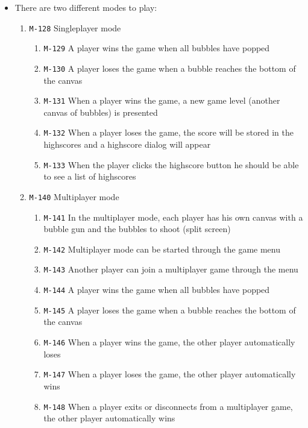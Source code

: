 \documentclass[a4paper]{article}
\begin{document}
\begin{itemize}
  \item There are two different modes to play:
  \begin{enumerate}
  
      \item \texttt{M-128} Singleplayer mode
      \begin{enumerate}
      	\item \texttt{M-129} A player wins the game when all bubbles have popped
        \item \texttt{M-130} A player loses the game when a bubble reaches the bottom of the canvas
        \item \texttt{M-131} When a player wins the game, a new game level (another canvas of bubbles) is presented
        \item \texttt{M-132} When a player loses the game, the score will be stored in the highscores and a highscore dialog will appear
        \item \texttt{M-133} When the player clicks the highscore button he should be able to see a list of highscores
      \end{enumerate}


      \item \texttt{M-140} Multiplayer mode
      \begin{enumerate}
      	\item \texttt{M-141} In the multiplayer mode, each player has his own canvas with a bubble gun and the bubbles to shoot (split screen)
      	\item \texttt{M-142} Multiplayer mode can be started through the game menu
        \item \texttt{M-143} Another player can join a multiplayer game through the menu
      	\item \texttt{M-144} A player wins the game when all bubbles have popped
        \item \texttt{M-145} A player loses the game when a bubble reaches the bottom of the canvas
        \item \texttt{M-146} When a player wins the game, the other player automatically loses
        \item \texttt{M-147} When a player loses the game, the other player automatically wins
        \item \texttt{M-148} When a player exits or disconnects from a multiplayer game, the other player automatically wins
        

\end{enumerate}
\end{enumerate}
\end{itemize}
\end{document}
